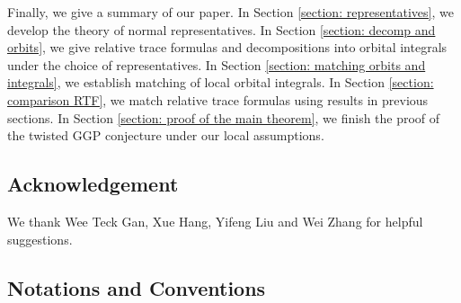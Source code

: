 \documentclass[11pt, reqno]{amsart}
\numberwithin{equation}{subsection}
\theoremstyle{plain}
\theoremstyle{definition}
\begin{document}
Finally, we give a summary of our paper. In Section \ref{section: representatives}, we develop the theory of normal representatives. In Section \ref{section: decomp and orbits}, we give relative trace formulas and decompositions into orbital integrals under the choice of representatives. In Section \ref{section: matching orbits and integrals}, we establish matching of local orbital integrals. In Section \ref{section: comparison RTF}, we match relative trace formulas using results in previous sections. In Section \ref{section: proof of the main theorem}, we finish the proof of the twisted GGP conjecture under our local assumptions. 



\subsection{Acknowledgement}
We thank Wee Teck Gan, Xue Hang, Yifeng Liu and Wei Zhang for helpful suggestions.

\subsection{Notations and Conventions}
\end{document}
